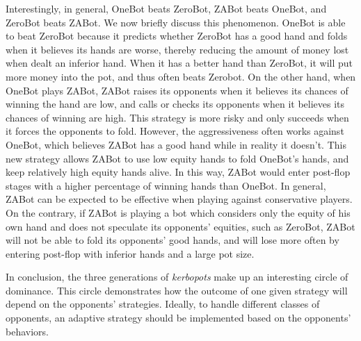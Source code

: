 Interestingly, in general, OneBot beats ZeroBot, ZABot beats OneBot, and ZeroBot beats ZABot. We now briefly discuss this phenomenon. OneBot is able to beat ZeroBot because it predicts whether ZeroBot has a good hand and folds when it believes its hands are worse, thereby reducing the amount of money lost when dealt an inferior hand. When it has a better hand than ZeroBot, it will put more money into the pot, and thus often beats Zerobot. On the other hand, when OneBot plays ZABot, ZABot raises its opponents when it believes its chances of winning the hand are low, and calls or checks its opponents when it believes its chances of winning are high. This strategy is more risky and only succeeds when it forces the opponents to fold. However, the aggressiveness often works against OneBot, which believes ZABot has a good hand while in reality it doesn't. This new strategy allows ZABot to use low equity hands to fold OneBot's hands, and keep relatively high equity hands alive. In this way, ZABot would enter post-flop stages with a higher percentage of winning hands than OneBot. In general, ZABot can be expected to be effective when playing against conservative players. On the contrary, if ZABot is playing a bot which considers only the equity of his own hand and does not speculate its opponents' equities, such as ZeroBot, ZABot will not be able to fold its opponents' good hands, and will lose more often by entering post-flop with inferior hands and a large pot size.

In conclusion, the three generations of \emph{kerbopots} make up an interesting circle of dominance. This circle demonstrates how the outcome of one given strategy will depend on the opponents' strategies. Ideally, to handle different classes of opponents, an adaptive strategy should be implemented based on the opponents' behaviors.
